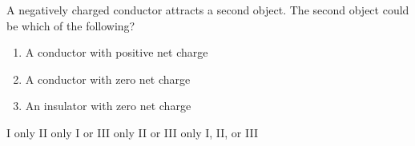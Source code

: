 \begin{questions}\setcounter{question}{14}\question
A negatively charged conductor attracts a second object. The second object could be which of the following?
\begin{enumerate}
    \item A conductor with positive net charge
    \item A conductor with zero net charge
    \item An insulator with zero net charge
\end{enumerate}

\begin{oneparchoices}
\choice I only
\choice II only
\choice I or III only
\choice II or III only
\choice I, II, or III
\end{oneparchoices}\end{questions}

